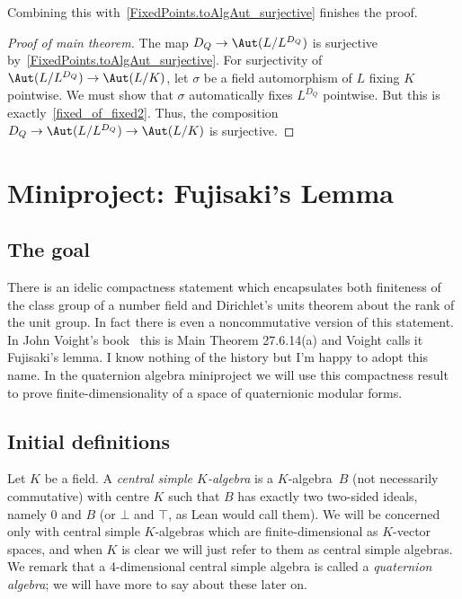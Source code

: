 Combining this with~\ref{FixedPoints.toAlgAut_surjective} finishes the proof.

\begin{proof}[Proof of main theorem]
  The map $D_Q \to \Aut(L/L^{D_Q})$ is surjective by~\ref{FixedPoints.toAlgAut_surjective}.
  For surjectivity of $\Aut(L/L^{D_Q}) \to \Aut(L/K)$, let $\sigma$ be a field automorphism of $L$
  fixing $K$ pointwise.
  We must show that $\sigma$ automatically fixes $L^{D_Q}$ pointwise.
  But this is exactly~\ref{fixed_of_fixed2}.
  Thus, the composition $D_Q \to \Aut(L/L^{D_Q}) \to \Aut(L/K)$ is surjective.
  \mathlibok
\end{proof}


\chapter{Miniproject: Fujisaki's Lemma}\label{Fujisaki_project}

\section{The goal}

There is an idelic compactness statement which encapsulates both finiteness of the class
group of a number field and Dirichlet's units theorem about the rank of the unit group.
In fact there is even a noncommutative version of this statement. In John Voight's
book~\cite{voightbook} this is Main Theorem 27.6.14(a) and Voight calls it Fujisaki’s lemma.
I know nothing of the history but I'm happy to adopt this name. In the quaternion algebra
miniproject we will use this compactness result to prove finite-dimensionality of a
space of quaternionic modular forms.

\section{Initial definitions}

Let $K$ be a field. A \emph{central simple $K$-algebra} is a $K$-algebra~$B$ (not necessarily
commutative) with centre $K$ such that $B$ has exactly two two-sided ideals, namely ${0}$ and $B$
(or $\bot$ and $\top$, as Lean would call them). We will be concerned
only with central simple $K$-algebras which are finite-dimensional as $K$-vector spaces, and
when $K$ is clear we will just refer to them as central simple algebras. We remark that a
4-dimensional central simple algebra is called a \emph{quaternion algebra}; we will have
more to say about these later on.

